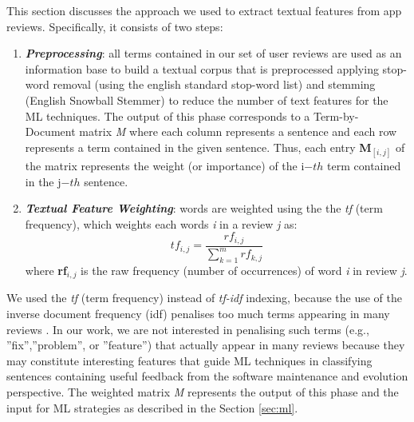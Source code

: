 
This section discusses the approach we used to extract textual features from app
reviews. Specifically, it consists of two steps:

\begin{enumerate}
\item \textbf{\textit{Preprocessing}}: all terms contained in our set of user reviews are used as an information base to build a textual corpus that is preprocessed  applying stop-word removal (using the english standard stop-word list) and stemming (English Snowball Stemmer)  to reduce the number of text features for the ML techniques. The output of this phase corresponds to a Term-by-Document matrix  \textit{M} where each column represents a sentence and each row represents a term contained in the given sentence. Thus, each entry \textbf{M$_{[i,j]}$} of the matrix represents the weight (or importance) of the i$-th$ term contained in the j$-th$ sentence. 
\item  \textbf{\textit{Textual Feature Weighting}}: words are weighted using the the \textit{tf} (term frequency), which weights each words \textit{i} in a review \textit{j} as:
$$ tf_{i,j} = \frac{ rf_{i,j} }{ \sum_{k=1}^{m} rf_{k,j}} $$
where  \textbf{rf$_{i,j}$} is the raw frequency (number of occurrences) of word  \textit{i} in review  \textit{j}.  
\end{enumerate}
 
We used the  \textit{tf} (term frequency) instead of  \textit{tf-idf} indexing, because the use of the inverse document frequency (idf) penalises too much terms appearing in many reviews \cite{paper:IR1992}. In our work, we are not interested in penalising such terms (e.g., ''fix'',''problem'', or ''feature'') that actually appear in many reviews because they may constitute interesting features that guide ML techniques in classifying sentences containing useful feedback from the software maintenance and evolution perspective.
The weighted matrix \textit{M} represents the output of this phase and the input for ML strategies as described in the Section \ref{sec:ml}.





